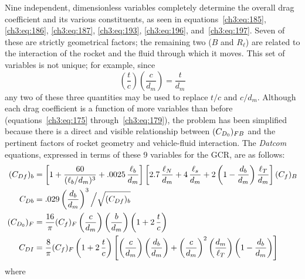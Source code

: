 Nine independent, dimensionless variables completely determine the overall drag coefficient and
its various constituents, as seen in equations~\eqref{ch3:eq:185}, \eqref{ch3:eq:186},
\eqref{ch3:eq:187}, \eqref{ch3:eq:193}, \eqref{ch3:eq:196}, and~\eqref{ch3:eq:197}. Seven of these
are strictly geometrical factors; the remaining two ($B$ and $R_\ell$) are related to the
interaction of the rocket and the fluid through which it moves. This set of variables is not
unique; for example, since
\begin{equation}\label{ch3:eq:198}
\left(\frac{t}{c}\right)\left(\frac{c}{d_m}\right) = \frac{t}{d_m}
\end{equation}
any two of these three quantities may be used to replace $t/c$ and $c/d_m$. Although each drag
coefficient is a function of more variables than before (equations~\eqref{ch3:eq:175}
through~\eqref{ch3:eq:179}), the problem has been simplified because there is a direct and visible
relationship between $(C_{D_0})_{FB}$ and the pertinent factors of rocket geometry and vehicle-fluid
interaction. The \emph{Datcom} equations, expressed in terms of these 9 variables for the GCR, are
as follows:
\begin{align}
(C_{Df})_b &= \left[1 + \frac{60}{(\ell_b/d_m)^3} + .0025\,\frac{\ell_b}{d_m}\right]
  \left[2.7\,\frac{\ell_N}{d_m} + 4\,\frac{\ell_s}{d_m}
  + 2\left(1 - \frac{d_b}{d_m}\right)\frac{\ell_T}{d_m}\right](C_f)_B \label{ch3:eq:199}\\
C_{Db} &= .029\left(\frac{d_b}{d_m}\right)^3\Big/\sqrt{(C_{Df})_b} \label{ch3:eq:200}\\
(C_{D_0})_F &= \frac{16}{\pi}(C_f)_F\left(\frac{c}{d_m}\right)\left(\frac{b}{d_m}\right)
  \left(1 + 2\,\frac{t}{c}\right) \label{ch3:eq:201}\\
C_{DI} &= \frac{8}{\pi}(C_f)_F\left(1 + 2\,\frac{t}{c}\right)
  \left[\left(\frac{c}{d_m}\right)\left(\frac{d_b}{d_m}\right)
  + \left(\frac{c}{d_m}\right)^2\left(\frac{d_m}{\ell_T}\right)\left(1 - \frac{d_b}{d_m}\right)\right]
  \label{ch3:eq:202}
\end{align}
where
